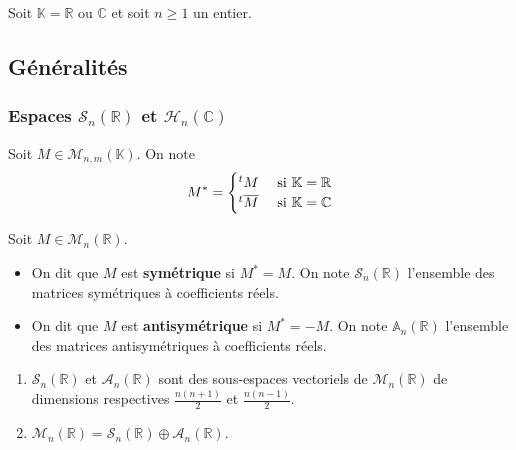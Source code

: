 




  Soit $\mathbb{K} = \mathbb{R}$ ou $\mathbb{C}$ et soit $n \geq 1$ un entier.

  \subsection{Généralités}

  \subsubsection{Espaces \texorpdfstring{$\mathcal{S}_n(\mathbb{R})$}{Sn(R)} et \texorpdfstring{$\mathcal{H}_n(\mathbb{C})$}{Hn(C)}}


  \begin{notation}
    Soit $M \in \mathcal{M}_{n,m}(\mathbb{K})$. On note
    \[
      M^* = \begin{cases}
        \mathstrut ^t M &\text{ si } \mathbb{K} = \mathbb{R} \\
        \mathstrut ^t \overline{M} &\text{ si } \mathbb{K} = \mathbb{C}
      \end{cases}
    \]
  \end{notation}


  \begin{definition}
    Soit $M \in \mathcal{M}_n(\mathbb{R})$.
    \begin{itemize}
      \item On dit que $M$ est \textbf{symétrique} si $M^* = M$. On note $\mathcal{S}_n(\mathbb{R})$ l'ensemble des matrices symétriques à coefficients réels.
      \item On dit que $M$ est \textbf{antisymétrique} si $M^* = -M$. On note $\mathbb{A}_n(\mathbb{R})$ l'ensemble des matrices antisymétriques à coefficients réels.
    \end{itemize}
  \end{definition}


  \begin{proposition}
    \begin{enumerate}[label={\bfseries(\roman*)}]
      \item $\mathcal{S}_n(\mathbb{R})$ et $\mathcal{A}_n(\mathbb{R})$ sont des sous-espaces vectoriels de $\mathcal{M}_n(\mathbb{R})$ de dimensions respectives $\frac{n(n+1)}{2}$ et $\frac{n(n-1)}{2}$.
      \item $\mathcal{M}_n(\mathbb{R}) = \mathcal{S}_n(\mathbb{R}) \oplus \mathcal{A}_n(\mathbb{R})$.
    \end{enumerate}
  \end{proposition}

